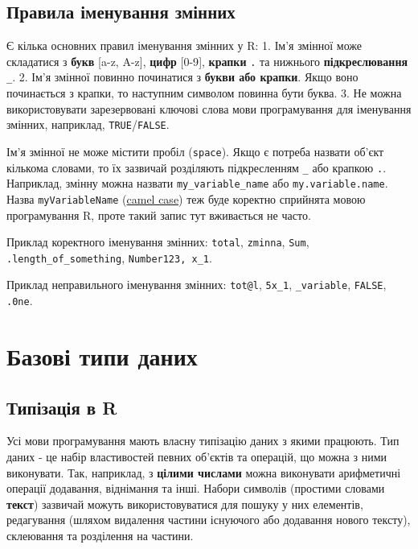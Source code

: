 \documentclass[
]{book}
\begin{document}
\hypertarget{chapter212}{%
\subsection{Правила іменування змінних}\label{chapter212}}

Є кілька основних правил іменування змінних у R:
1. Ім'я змінної може складатися з \textbf{букв} {[}a-z, A-z{]}, \textbf{цифр} {[}0-9{]}, \textbf{крапки} \texttt{.} та нижнього \textbf{підкреслювання} \texttt{\_}.
2. Ім'я змінної повинно починатися з \textbf{букви або крапки}. Якщо воно починається з крапки, то наступним символом повинна бути буква.
3. Не можна використовувати зарезервовані ключові слова мови програмування для іменування змінних, наприклад, \texttt{TRUE}/\texttt{FALSE}.

Ім'я змінної не може містити пробіл (\texttt{space}). Якщо є потреба назвати об'єкт кількома словами, то їх зазвичай розділяють підкресленням \texttt{\_} або крапкою \texttt{.}. Наприклад, змінну можна назвати \texttt{my\_variable\_name} або \texttt{my.variable.name}. Назва \texttt{myVariableName} (\href{https://en.wikipedia.org/wiki/Camel_case}{camel case}) теж буде коректно сприйнята мовою програмування R, проте такий запис тут вживається не часто.

{Приклад коректного іменування змінних:} \texttt{total}, \texttt{zminna}, \texttt{Sum}, \texttt{.length\_of\_something}, \texttt{Number123,\ x\_1}.

{Приклад неправильного іменування змінних:} \texttt{tot@l}, \texttt{5x\_1}, \texttt{\_variable}, \texttt{FALSE}, \texttt{.0ne}.

\hypertarget{chapter22}{%
\section{Базові типи даних}\label{chapter22}}

\hypertarget{chapter221}{%
\subsection{Типізація в R}\label{chapter221}}

Усі мови програмування мають власну типізацію даних з якими працюють. Тип даних - це набір властивостей певних об'єктів та операцій, що можна з ними виконувати. Так, наприклад, з \textbf{цілими числами} можна виконувати арифметичні операції додавання, віднімання та інші. Набори символів (простими словами \textbf{текст}) зазвичай можуть використовуватися для пошуку у них елементів, редагування (шляхом видалення частини існуючого або додавання нового тексту), склеювання та розділення на частини.
\end{document}

